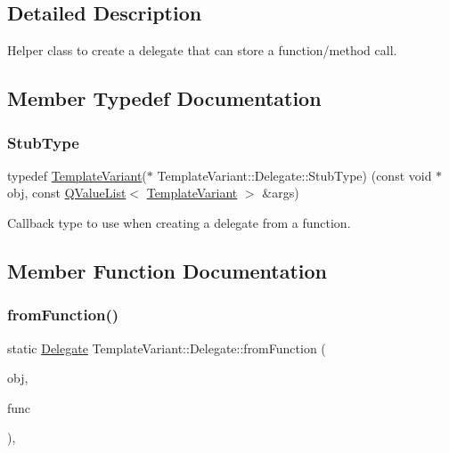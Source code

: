\subsection{Detailed Description}
Helper class to create a delegate that can store a function/method call. 

\subsection{Member Typedef Documentation}
\mbox{\label{class_template_variant_1_1_delegate_ae02c3848db4a42a6bc88f81f5166923a}} 
\subsubsection{\texorpdfstring{StubType}{StubType}}
{\footnotesize\ttfamily typedef \mbox{\hyperlink{class_template_variant}{Template\+Variant}}($\ast$ Template\+Variant\+::\+Delegate\+::\+Stub\+Type) (const void $\ast$obj, const \mbox{\hyperlink{class_q_value_list}{Q\+Value\+List}}$<$ \mbox{\hyperlink{class_template_variant}{Template\+Variant}} $>$ \&args)}

Callback type to use when creating a delegate from a function. 

\subsection{Member Function Documentation}
\mbox{\label{class_template_variant_1_1_delegate_a226f1f2e20f6d26fea2d989fd91bd8a8}} 
\subsubsection{\texorpdfstring{fromFunction()}{fromFunction()}}
{\footnotesize\ttfamily static \mbox{\hyperlink{class_template_variant_1_1_delegate}{Delegate}} Template\+Variant\+::\+Delegate\+::from\+Function (\begin{DoxyParamCaption}\item[{const void $\ast$}]{obj,  }\item[{\mbox{\hyperlink{class_template_variant_1_1_delegate_ae02c3848db4a42a6bc88f81f5166923a}{Stub\+Type}}}]{func }\end{DoxyParamCaption})\hspace{0.3cm}{\ttfamily [inline]}, {\ttfamily [static]}}

